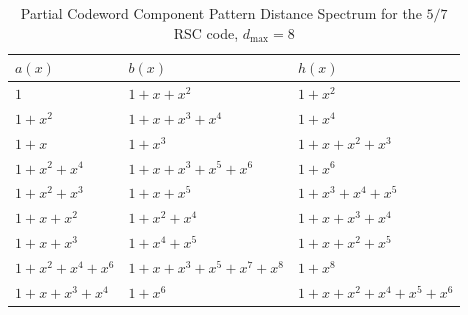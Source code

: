 \begin{table}[htbp]
 \caption{Partial Codeword Component Pattern Distance Spectrum for the $5/7$ RSC code, $d_{\text{max}}=8$}
\centering
 \begin{tabularx}{0.45\textwidth}{XlX} 
 \hline
 $a(x)$ & $b(x)$ & $h(x)$ \\ %
 \hline\hline
$1$ & $1+x+x^{2}$ & $1+x^2$\\
\hline
$1+x^2$ & $1+x+x^3+x^4$ & $1+x^{4}$\\
\hline
$1+x$ & $1+x^3$ & $1+x+x^2+x^3$\\
\hline
$1+x^2+x^4$ & $1+x+x^3+x^5+x^6$ & $1+x^{6}$\\
\hline
$1+x^2+x^3$ & $1+x+x^5$ & $1+x^3+x^4+x^5$\\
\hline
$1+x+x^2$ & $1+x^2+x^4$ & $1+x+x^3+x^4$\\
\hline
$1+x+x^3$ & $1+x^4+x^5$ & $1+x+x^2+x^5$\\
\hline
$1+x^2+x^4+x^6$ & $1+x+x^3+x^5+x^7+x^8$ & $1+x^8$\\
\hline
$1+x+x^3+x^4$ & $1+x^6$ & $1+x+x^2+x^4+x^5+x^6$\\
 \end{tabularx}
 
 \label{novelTab13}
\end{table}

